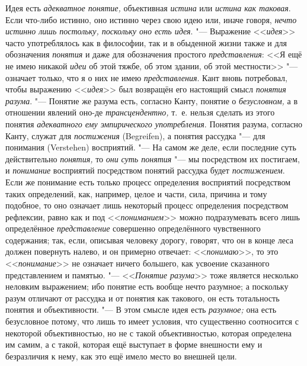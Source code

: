 Идея есть {\em адекватное понятие,} объективная
{\em истина} или
{\em истина как таковая}.
Если что-либо истинно, оно истинно через свою идею или, иначе
говоря, {\em нечто истинно лишь
постольку, поскольку оно есть идея}. "--- Выражение
<<{\em идея}>> часто
употреблялось как в философии, так и в обыденной жизни также и для
обозначения {\em понятия}
и даже для обозначения простого
{\em представления}: <<Я
ещё не имею никакой {\em идеи}
об этой тяжбе, об этом здании, об этой местности>>
"--- означает только, что я о них не имею
{\em представления}. Кант
вновь потребовал, чтобы выражению
<<{\em идея}>> был
возвращён его настоящий смысл
{\em понятия разума}.
"--- Понятие же разума есть, согласно Канту, понятие о
{\em безусловном,} а в
отношении явлений оно-де
{\em трансцендентно,}
т.~е. нельзя сделать из этого понятия
{\em адекватного ему эмпирического
употребления}. Понятия разума, согласно Канту, служат для
{\em постижения} (Begreifen),
а понятия рассудка "--- для понимания (Verstehen)
восприятий. "--- На самом же деле, если последние суть
действительно {\em понятия,} то {\em они}
{\em суть понятия} "--- мы посредством их постигаем, и {\em понимание}
восприятий посредством понятий рассудка будет {\em постижением}. Если
же понимание есть только процесс определения восприятий посредством таких
определений, как, например, целое и части, сила, причина и тому подобное,
то оно означает лишь некоторый процесс определения посредством рефлексии,
равно как и под <<{\em пониманием}>>
можно подразумевать всего лишь определённое {\em представление}
совершенно определённого чувственного содержания; так, если,
описывая человеку дорогу, говорят, что он в конце леса должен повернуть
налево, и он примерно отвечает: <<{\em понимаю}>>, то это
<<{\em понимание}>> не означает ничего большего, как усвоение сказанного
представлением и памятью. "--- <<{\em Понятие разума}>>
тоже является несколько неловким выражением; ибо понятие есть
вообще нечто разумное; а поскольку разум отличают от рассудка и от понятия
как такового, он есть тотальность понятия и объективности. "---
В этом смысле идея есть {\em разумное;} она есть
безусловное потому, что лишь то имеет условия, что существенно соотносится
с некоторой объективностью, но не с такой объективностью, которая
определена им самим, а с такой, которая ещё выступает в форме внешности ему
и безразличия к нему, как это ещё имело место во внешней цели.

